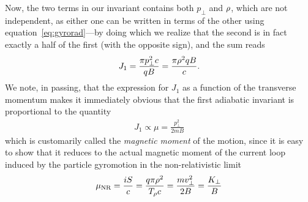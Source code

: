Now, the two terms in our invariant contains both $p_\perp$ and $\rho$, which
are not independent, as either one can be written in terms of the other using
equation~\eqref{eq:gyrorad}---by doing which we realize that the second is in fact
exactly a half of the first (with the opposite sign), and the sum reads
\begin{align}
  J_1 = \frac{\pi p_\perp^2 c}{qB} = \frac{\pi \rho^2 qB}{c}.
\end{align}
We note, in passing, that the expression for $J_1$ as a function of the transverse
momentum makes it immediately obvious that the first adiabatic invariant is
proportional to the quantity
\begin{align*}
  J_1 \propto \mu = \frac{p_\perp^2}{2mB}
\end{align*}
which is customarily called the \emph{magnetic moment} of the motion, since it is
easy to show that it reduces to the actual magnetic moment of the current loop
induced by the particle gyromotion in the non-relativistic limit
\begin{align*}
  \mu_\text{NR} = \frac{iS}{c} = \frac{q \pi \rho^2}{T_{\rho} c} =
  \frac{m v_\perp^2 }{2 B} = \frac{K_\perp}{B}
\end{align*}

